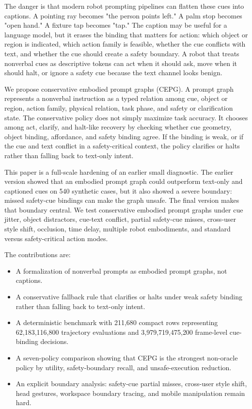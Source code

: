 \documentclass{article}
\newcommand{\method}{CEPG}
\newcommand{\rowN}{211{,}680}
\newcommand{\trajN}{62{,}183{,}116{,}800}
\newcommand{\frameN}{3{,}979{,}719{,}475{,}200}
\begin{document}
The danger is that modern robot prompting pipelines can flatten these cues into captions. A pointing ray becomes "the person points left." A palm stop becomes "open hand." A fixture tap becomes "tap." The caption may be useful for a language model, but it erases the binding that matters for action: which object or region is indicated, which action family is feasible, whether the cue conflicts with text, and whether the cue should create a safety boundary. A robot that treats nonverbal cues as descriptive tokens can act when it should ask, move when it should halt, or ignore a safety cue because the text channel looks benign.

We propose conservative embodied prompt graphs (\method{}). A prompt graph represents a nonverbal instruction as a typed relation among cue, object or region, action family, physical relation, task phase, and safety or clarification state. The conservative policy does not simply maximize task accuracy. It chooses among act, clarify, and halt-like recovery by checking whether cue geometry, object binding, affordance, and safety binding agree. If the binding is weak, or if the cue and text conflict in a safety-critical context, the policy clarifies or halts rather than falling back to text-only intent.

This paper is a full-scale hardening of an earlier small diagnostic. The earlier version showed that an embodied prompt graph could outperform text-only and captioned cues on 540 synthetic cases, but it also showed a severe boundary: missed safety-cue bindings can make the graph unsafe. The final version makes that boundary central. We test conservative embodied prompt graphs under cue jitter, object distractors, cue-text conflict, partial safety-cue misses, cross-user style shift, occlusion, time delay, multiple robot embodiments, and standard versus safety-critical action modes.

The contributions are:
\begin{itemize}
\item A formalization of nonverbal prompts as embodied prompt graphs, not captions.
\item A conservative fallback rule that clarifies or halts under weak safety binding rather than falling back to text-only intent.
\item A deterministic benchmark with \rowN{} compact rows representing \trajN{} trajectory evaluations and \frameN{} frame-level cue-binding decisions.
\item A seven-policy comparison showing that \method{} is the strongest non-oracle policy by utility, safety-boundary recall, and unsafe-execution reduction.
\item An explicit boundary analysis: safety-cue partial misses, cross-user style shift, head gestures, workspace boundary tracing, and mobile manipulation remain hard.
\end{itemize}
\end{document}
